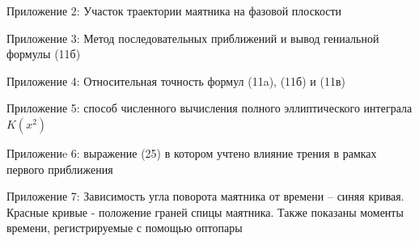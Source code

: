 \documentclass[a4paper]{article}
\begin{document}
Приложение 2: Участок траектории маятника на фазовой плоскости

Приложение 3: Метод последовательных приближений и вывод гениальной формулы (11б)

Приложение 4: Относительная точность формул (11a), (11б) и (11в)

Приложение 5: способ численного вычисления полного эллиптического интеграла $K(x^2)$

Приложениe 6:  выражение (25) в котором учтено влияние трения в рамках первого приближения

Приложение 7: Зависимость угла поворота маятника от времени – синяя кривая.
Красные кривые - положение граней спицы маятника. Также показаны
моменты времени, регистрируемые с помощью оптопары
\end{document}
